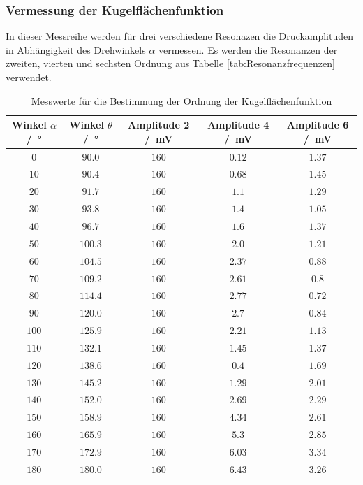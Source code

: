 \subsubsection{Vermessung der Kugelflächenfunktion}
In dieser Messreihe werden für drei verschiedene Resonazen die Druckamplituden in Abhängigkeit des Drehwinkels $\alpha$ vermessen.
Es werden die Resonanzen der zweiten, vierten und sechsten Ordnung aus Tabelle \ref{tab:Resonanzfrequenzen} verwendet.
\FloatBarrier
\begin{table}
    \centering
    \caption{Messwerte für die Bestimmung der Ordnung der Kugelflächenfunktion}
    \label{tab:Amplituden_Kugelflächenfunktion}
    \begin{tabular}{c c c c c}
        \toprule
        Winkel $\alpha$ /\SI{}{\degree}&Winkel $\theta$ /\SI{}{\degree}&Amplitude 2 /\SI{}{\milli\volt}&Amplitude 4 /\SI{}{\milli\volt}& Amplitude 6 /\SI{}{\milli\volt}\\
        \midrule
        $\num{0}$  &$\num{90.0}$  &$\num{160}$&$\num{0.12}$&$\num{1.37}$\\
        $\num{10}$ &$\num{90.4}$ &$\num{160}$&$\num{0.68}$&$\num{1.45}$\\
        $\num{20}$ &$\num{91.7}$ &$\num{160}$&$\num{1.1}$&$\num{1.29}$\\
        $\num{30}$ &$\num{93.8}$ &$\num{160}$&$\num{1.4}$&$\num{1.05}$\\
        $\num{40}$ &$\num{96.7}$ &$\num{160}$&$\num{1.6}$&$\num{1.37}$\\
        $\num{50}$ &$\num{100.3}$ &$\num{160}$&$\num{2.0}$&$\num{1.21}$\\
        $\num{60}$ &$\num{104.5}$ &$\num{160}$&$\num{2.37}$&$\num{0.88}$\\
        $\num{70}$ &$\num{109.2}$ &$\num{160}$&$\num{2.61}$&$\num{0.8}$\\
        $\num{80}$ &$\num{114.4}$ &$\num{160}$&$\num{2.77}$&$\num{0.72}$\\
        $\num{90}$ &$\num{120.0}$ &$\num{160}$&$\num{2.7}$&$\num{0.84}$\\
        $\num{100}$&$\num{125.9}$&$\num{160}$&$\num{2.21}$&$\num{1.13}$\\
        $\num{110}$&$\num{132.1}$&$\num{160}$&$\num{1.45}$&$\num{1.37}$\\
        $\num{120}$&$\num{138.6}$&$\num{160}$&$\num{0.4}$&$\num{1.69}$\\
        $\num{130}$&$\num{145.2}$&$\num{160}$&$\num{1.29}$&$\num{2.01}$\\
        $\num{140}$&$\num{152.0}$&$\num{160}$&$\num{2.69}$&$\num{2.29}$\\
        $\num{150}$&$\num{158.9}$&$\num{160}$&$\num{4.34}$&$\num{2.61}$\\
        $\num{160}$&$\num{165.9}$&$\num{160}$&$\num{5.3}$&$\num{2.85}$\\
        $\num{170}$&$\num{172.9}$&$\num{160}$&$\num{6.03}$&$\num{3.34}$\\
        $\num{180}$&$\num{180.0}$&$\num{160}$&$\num{6.43}$&$\num{3.26}$\\
        \bottomrule
    \end{tabular}
\end{table}
